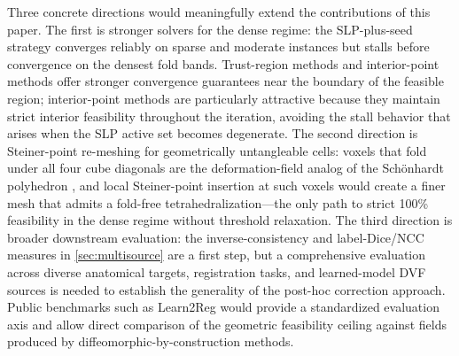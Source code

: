 Three concrete directions would meaningfully extend the contributions of this paper. The first is stronger solvers for the dense regime: the SLP-plus-seed strategy converges reliably on sparse and moderate instances but stalls before convergence on the densest fold bands. Trust-region methods \cite{Conn2000} and interior-point methods \cite{Byrd2000} offer stronger convergence guarantees near the boundary of the feasible region; interior-point methods are particularly attractive because they maintain strict interior feasibility throughout the iteration, avoiding the stall behavior that arises when the SLP active set becomes degenerate. The second direction is Steiner-point re-meshing for geometrically untangleable cells: voxels that fold under all four cube diagonals are the deformation-field analog of the Sch{\"o}nhardt polyhedron \cite{schonhardt1928}, and local Steiner-point insertion at such voxels would create a finer mesh that admits a fold-free tetrahedralization---the only path to strict 100\% feasibility in the dense regime without threshold relaxation. The third direction is broader downstream evaluation: the inverse-consistency and label-Dice/NCC measures in \autoref{sec:multisource} are a first step, but a comprehensive evaluation across diverse anatomical targets, registration tasks, and learned-model DVF sources is needed to establish the generality of the post-hoc correction approach. Public benchmarks such as Learn2Reg \cite{learn2reg2023} would provide a standardized evaluation axis and allow direct comparison of the geometric feasibility ceiling against fields produced by diffeomorphic-by-construction methods.
